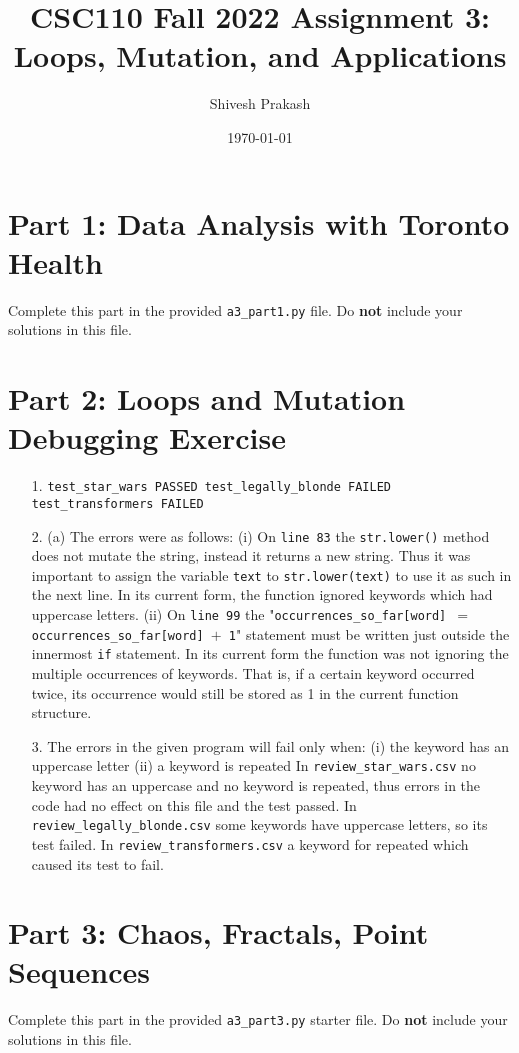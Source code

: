 \documentclass[11pt]{article}
\title{CSC110 Fall 2022 Assignment 3: Loops, Mutation, and Applications}
\author{Shivesh Prakash}
\date{\today}
\begin{document}
\maketitle

\section*{Part 1: Data Analysis with Toronto Health}

Complete this part in the provided \texttt{a3\_part1.py} file.
Do \textbf{not} include your solutions in this file.

\section*{Part 2: Loops and Mutation Debugging Exercise}

\begin{enumerate}
\item[1.]
\texttt{test\_star\_wars PASSED \newline
test\_legally\_blonde FAILED \newline
test\_transformers FAILED}

\item[2.]
(a) The errors were as follows: \newline
(i) On \texttt{line 83} the \texttt{str.lower()} method does not mutate the string, instead it returns a new string. Thus it was important to assign the variable \texttt{text} to \texttt{str.lower(text)} to use it as such in the next line. In its current form, the function ignored keywords which had uppercase letters. \newline
(ii) On \texttt{line 99} the "\texttt{occurrences\_so\_far[word] $=$ occurrences\_so\_far[word] $+$ 1}" statement must be written just outside the innermost \texttt{if} statement. In its current form the function was not ignoring the multiple occurrences of keywords. That is, if a certain keyword occurred twice, its occurrence would still be stored as 1 in the current function structure.

\item[3.]
The errors in the given program will fail only when: \newline
(i) the keyword has an uppercase letter \newline
(ii) a keyword is repeated \newline
In \texttt{review\_star\_wars.csv} no keyword has an uppercase and no keyword is repeated, thus errors in the code had no effect on this file and the test passed. In \texttt{review\_legally\_blonde.csv} some keywords have uppercase letters, so its test failed. In \texttt{review\_transformers.csv} a keyword for repeated which caused its test to fail.
\end{enumerate}

\section*{Part 3: Chaos, Fractals, Point Sequences}

Complete this part in the provided \texttt{a3\_part3.py} starter file.
Do \textbf{not} include your solutions in this file.
\end{document}
